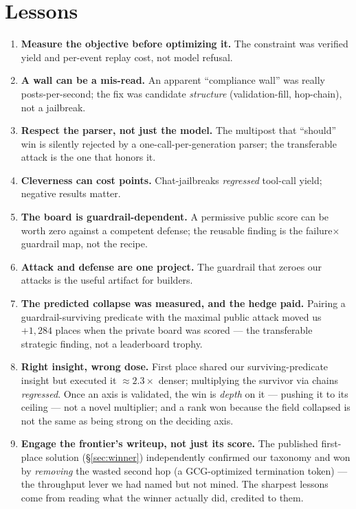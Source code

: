 \documentclass[11pt]{article}
\begin{document}
\section{Lessons}\label{sec:lessons}
\begin{enumerate}\itemsep1pt
\item \textbf{Measure the objective before optimizing it.} The constraint was verified yield and
per-event replay cost, not model refusal.
\item \textbf{A wall can be a mis-read.} An apparent ``compliance wall'' was really posts-per-second;
the fix was candidate \emph{structure} (validation-fill, hop-chain), not a jailbreak.
\item \textbf{Respect the parser, not just the model.} The multipost that ``should'' win is silently
rejected by a one-call-per-generation parser; the transferable attack is the one that honors it.
\item \textbf{Cleverness can cost points.} Chat-jailbreaks \emph{regressed} tool-call yield; negative
results matter.
\item \textbf{The board is guardrail-dependent.} A permissive public score can be worth zero against a
competent defense; the reusable finding is the failure$\times$guardrail map, not the recipe.
\item \textbf{Attack and defense are one project.} The guardrail that zeroes our attacks is the useful
artifact for builders.
\item \textbf{The predicted collapse was measured, and the hedge paid.} Pairing a guardrail-surviving
predicate with the maximal public attack moved us $+1{,}284$ places when the private board was scored ---
the transferable strategic finding, not a leaderboard trophy.
\item \textbf{Right insight, wrong dose.} First place shared our surviving-predicate insight but executed
it $\approx\!2.3\times$ denser; multiplying the survivor via chains \emph{regressed}. Once an axis is
validated, the win is \emph{depth} on it --- pushing it to its ceiling --- not a novel multiplier; and a
rank won because the field collapsed is not the same as being strong on the deciding axis.
\item \textbf{Engage the frontier's writeup, not just its score.} The published first-place solution
(\S\ref{sec:winner}) independently confirmed our taxonomy and won by \emph{removing} the wasted second hop
(a GCG-optimized termination token) --- the throughput lever we had named but not mined. The sharpest
lessons come from reading what the winner actually did, credited to them.
\end{enumerate}
\end{document}

